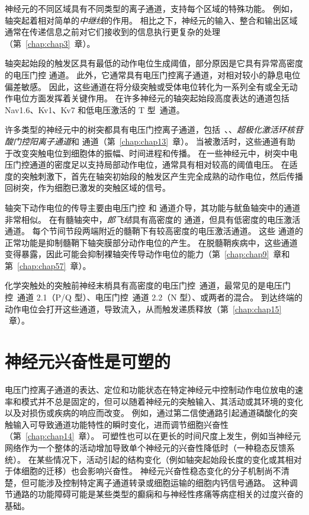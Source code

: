 神经元的不同区域具有不同类型的离子通道，支持每个区域的特殊功能。
例如，轴突起着相对简单的\textit{中继线}的作用。
相比之下，神经元的输入、整合和输出区域通常在传递信息之前对它们接收到的信息执行更复杂的处理（第~\ref{chap:chap3}~章）。


轴突起始段的触发区具有最低的动作电位生成阈值，部分原因是它具有异常高密度的电压门控  通道。
此外，它通常具有电压门控离子通道，对相对较小的静息电位偏差敏感。
因此，这些通道在将分级突触或受体电位转化为一系列全有或全无动作电位方面发挥着关键作用。
在许多神经元的轴突起始段高度表达的通道包括 Nav1.6、Kv1、Kv7 和低电压激活的 T 型~通道。


许多类型的神经元中的树突都具有电压门控离子通道，包括~、、\textit{超极化激活环核苷酸门控阳离子通道}和  通道（第~\ref{chap:chap13}~章）。
当被激活时，这些通道有助于改变突触电位到细胞体的振幅、时间进程和传播。
在一些神经元中，树突中电压门控通道的密度足以支持局部动作电位，通常具有相对较高的阈值电压。
在适度的突触刺激下，首先在轴突初始段的触发区产生完全成熟的动作电位，然后传播回树突，作为细胞已激发的突触区域的信号。


轴突下动作电位的传导主要由电压门控  和  通道介导，其功能与鱿鱼轴突中的通道非常相似。
在有髓轴突中，\textit{郎飞结}具有高密度的  通道，但具有低密度的电压激活  通道。
每个节间节段两端附近的髓鞘下有较高密度的电压激活通道。
这些  通道的正常功能是抑制髓鞘下轴突膜部分动作电位的产生。
在脱髓鞘疾病中，这些通道变得暴露，因此可能会抑制裸轴突传导动作电位的能力（第~\ref{chap:chap9}~章和第~\ref{chap:chap57}~章）。


化学突触处的突触前神经末梢具有高密度的电压门控~通道，最常见的是电压门控~通道 2.1（P/Q 型）、电压门控~通道 2.2（N 型）、或两者的混合。
到达终端的动作电位会打开这些通道，导致流入，从而触发递质释放（第~\ref{chap:chap15} ~章）。



\section{神经元兴奋性是可塑的}

电压门控离子通道的表达、定位和功能状态在特定神经元中控制动作电位放电的速率和模式并不总是固定的，但可以随着神经元的突触输入、其活动或其环境的变化以及对损伤或疾病的响应而改变。
例如，通过第二信使通路引起通道磷酸化的突触输入可导致通道功能特性的瞬时变化，进而调节细胞兴奋性（第~\ref{chap:chap14}~章）。
可塑性也可以在更长的时间尺度上发生，例如当神经元网络作为一个整体的活动增加导致单个神经元的兴奋性降低时（一种稳态反馈系统）。
在某些情况下，活动引起的结构变化（例如轴突起始段长度的变化或其相对于体细胞的迁移）也会影响兴奋性。
神经元兴奋性稳态变化的分子机制尚不清楚，但可能涉及控制特定离子通道转录或细胞运输的细胞内钙信号通路。 
这种调节通路的功能障碍可能是某些类型的癫痫和与神经性疼痛等病症相关的过度兴奋的基础。




